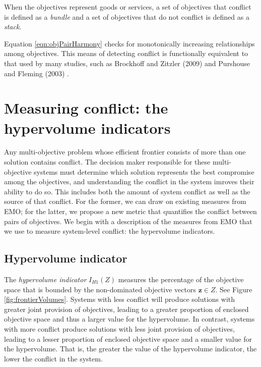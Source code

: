 When the objectives represent goods or services, a set of objectives that conflict is defined as a \textit{bundle} and a set of objectives that do not conflict is defined as a \textit{stack}.

Equation \eqref{eqn:objPairHarmony} checks for monotonically increasing relationships among objectives. This means of detecting conflict is functionally equivalent to that used by many studies, such as Brockhoff and Zitzler (2009) \cite{brockhoff2009objective} and Purshouse and Fleming (2003) \cite{purshouse2003conflict}.

\section{Measuring conflict: the hypervolume indicators}
\label{sec:waysToMeasureFrontiers}
Any multi-objective problem whose efficient frontier consists of more than one solution contains conflict. The decision maker responsible for these multi-objective systems must determine which solution represents the best compromise among the objectives, and understanding the conflict in the system imroves their ability to do so. This includes both the amount of system conflict as well as the source of that conflict. For the former, we can draw on existing measures from EMO; for the latter, we propose a new metric that quantifies the conflict between pairs of objectives. We begin with a description of the measures from EMO that we use to measure system-level conflict: the hypervolume indicators.

\subsection{Hypervolume indicator}
The \textit{hypervolume indicator} $I_{H1}(Z)$ measures the percentage of the objective space that is bounded by the non-dominated objective vectors $\mathbf{z} \in Z$. See Figure \ref{fig:frontierVolumes}. Systems with less conflict will produce solutions with greater joint provision of objectives, leading to a greater proportion of enclosed objective space and thus a larger value for the hypervolume. In contrast, systems with more conflict produce solutions with less joint provision of objectives, leading to a lesser proportion of enclosed objective space and a smaller value for the hypervolume. That is, the greater the value of the hypervolume indicator, the lower the conflict in the system.

